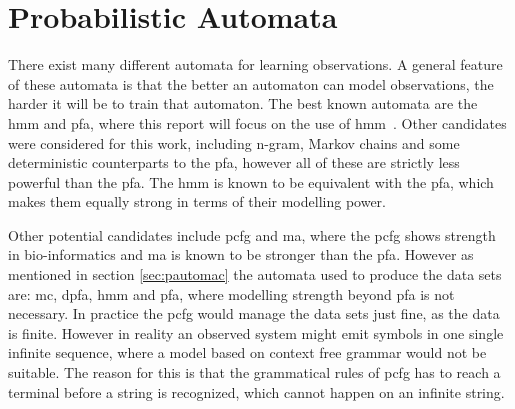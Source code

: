 \section{Probabilistic Automata}
There exist many different automata for learning observations. A general feature of these automata is that the better an automaton can model observations, the harder it will be to train that automaton. The best known automata are the \gls{hmm} and \gls{pfa}, where this report will focus on the use of \gls{hmm}~\cite{pautomacTR}.
Other candidates were considered for this work, including n-gram, Markov chains and some deterministic counterparts to the \gls{pfa}, however all of these are strictly less powerful than the \gls{pfa}. The \gls{hmm} is known to be equivalent with the \gls{pfa}, which makes them equally strong in terms of their modelling power.

Other potential candidates include \gls{pcfg} and \gls{ma}, where the \gls{pcfg} shows strength in bio-informatics and \gls{ma} is known to be stronger than the \gls{pfa}. However as mentioned in section \ref{sec:pautomac} the automata used to produce the data sets are: \gls{mc}, \gls{dpfa}, \gls{hmm} and \gls{pfa}, where modelling strength beyond \gls{pfa} is not necessary. In practice the \gls{pcfg} would manage the data sets just fine, as the data is finite. However in reality an observed system might emit symbols in one single infinite sequence, where a model based on context free grammar would not be suitable. The reason for this is that the grammatical rules of \gls{pcfg} has to reach a terminal before a string is recognized, which cannot happen on an infinite string.